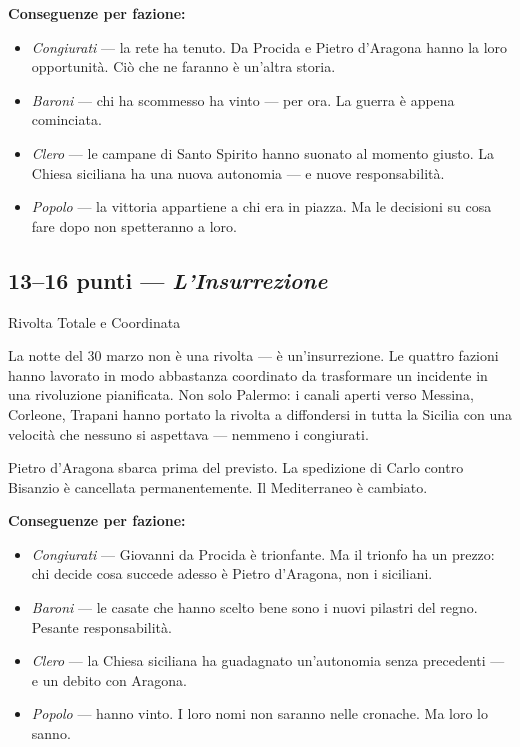 \textbf{Conseguenze per fazione:}
\begin{itemize}[nosep]
  \item \textit{Congiurati} — la rete ha tenuto. Da Procida e
    Pietro d'Aragona hanno la loro opportunità. Ciò che ne faranno
    è un'altra storia.
  \item \textit{Baroni} — chi ha scommesso ha vinto — per ora.
    La guerra è appena cominciata.
  \item \textit{Clero} — le campane di Santo Spirito hanno suonato
    al momento giusto. La Chiesa siciliana ha una nuova autonomia —
    e nuove responsabilità.
  \item \textit{Popolo} — la vittoria appartiene a chi era in piazza.
    Ma le decisioni su cosa fare dopo non spetteranno a loro.
\end{itemize}


\secsep

\subsection{13--16 punti — \textit{L'Insurrezione}}
\textcolor{oro}{\cinzel\large Rivolta Totale e Coordinata}

\filetto

La notte del 30 marzo non è una rivolta — è un'insurrezione.
Le quattro fazioni hanno lavorato in modo abbastanza coordinato
da trasformare un incidente in una rivoluzione pianificata.
Non solo Palermo: i canali aperti verso Messina, Corleone,
Trapani hanno portato la rivolta a diffondersi in tutta la Sicilia
con una velocità che nessuno si aspettava — nemmeno i congiurati.

Pietro d'Aragona sbarca prima del previsto. La spedizione di Carlo
contro Bisanzio è cancellata permanentemente. Il Mediterraneo
è cambiato.

\textbf{Conseguenze per fazione:}
\begin{itemize}[nosep]
  \item \textit{Congiurati} — Giovanni da Procida è trionfante.
    Ma il trionfo ha un prezzo: chi decide cosa succede adesso
    è Pietro d'Aragona, non i siciliani.
  \item \textit{Baroni} — le casate che hanno scelto bene sono
    i nuovi pilastri del regno. Pesante responsabilità.
  \item \textit{Clero} — la Chiesa siciliana ha guadagnato
    un'autonomia senza precedenti — e un debito con Aragona.
  \item \textit{Popolo} — hanno vinto. I loro nomi non saranno
    nelle cronache. Ma loro lo sanno.
\end{itemize}

